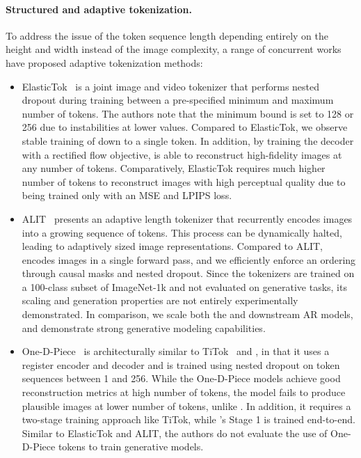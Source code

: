 \paragraph{Structured and adaptive tokenization.}
To address the issue of the token sequence length depending entirely on the height and width instead of the image complexity, a range of concurrent works have proposed adaptive tokenization methods:
\begin{itemize}
    \item ElasticTok~\cite{Yan2024ElasticTok} is a joint image and video tokenizer that performs nested dropout during training between a pre-specified minimum and maximum number of tokens. The authors note that the minimum bound is set to 128 or 256 due to instabilities at lower values. Compared to ElasticTok, we observe stable training of \ours down to a single token. In addition, by training the decoder with a rectified flow objective, \ours is able to reconstruct high-fidelity images at any number of tokens. Comparatively, ElasticTok requires much higher number of tokens to reconstruct images with high perceptual quality due to being trained only with an MSE and LPIPS loss.
    \item ALIT~\cite{Duggal2024ALIT} presents an adaptive length tokenizer that recurrently encodes images into a growing sequence of tokens. This process can be dynamically halted, leading to adaptively sized image representations. Compared to ALIT, \ours encodes images in a single forward pass, and we efficiently enforce an ordering through causal masks and nested dropout. Since the tokenizers are trained on a 100-class subset of ImageNet-1k and not evaluated on generative tasks, its scaling and generation properties are not entirely experimentally demonstrated. In comparison, we scale both the \ours and downstream AR models, and demonstrate strong generative modeling capabilities.
    \item One-D-Piece~\cite{miwa2025onedpiece} is architecturally similar to TiTok~\cite{yu2024titok} and \ours, in that it uses a register encoder and decoder and is trained using nested dropout on token sequences between 1 and 256. While the One-D-Piece models achieve good reconstruction metrics at high number of tokens, the model fails to produce plausible images at lower number of tokens, unlike \ours. In addition, it requires a two-stage training approach like TiTok, while \ours's Stage 1 is trained end-to-end. Similar to ElasticTok and ALIT, the authors do not evaluate the use of One-D-Piece tokens to train generative models.

\end{itemize}
